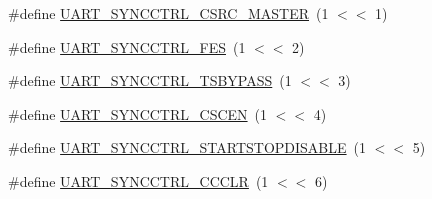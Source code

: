 \begin{DoxyCompactItemize}
\#define \hyperlink{group__UART__17XX__40XX_ga4776a7aa288f3c34e56db78cfb7032eb}{U\-A\-R\-T\-\_\-\-S\-Y\-N\-C\-C\-T\-R\-L\-\_\-\-C\-S\-R\-C\-\_\-\-M\-A\-S\-T\-E\-R}~(1 $<$$<$ 1)
\item 
\#define \hyperlink{group__UART__17XX__40XX_ga5263f24b5804673c99e8c6f09c95aed4}{U\-A\-R\-T\-\_\-\-S\-Y\-N\-C\-C\-T\-R\-L\-\_\-\-F\-E\-S}~(1 $<$$<$ 2)
\item 
\#define \hyperlink{group__UART__17XX__40XX_gaea12c85ea0d6a9fa91242904c707a285}{U\-A\-R\-T\-\_\-\-S\-Y\-N\-C\-C\-T\-R\-L\-\_\-\-T\-S\-B\-Y\-P\-A\-S\-S}~(1 $<$$<$ 3)
\item 
\#define \hyperlink{group__UART__17XX__40XX_ga17ff94fa4369905ab4a5f3bf28f44ced}{U\-A\-R\-T\-\_\-\-S\-Y\-N\-C\-C\-T\-R\-L\-\_\-\-C\-S\-C\-E\-N}~(1 $<$$<$ 4)
\item 
\#define \hyperlink{group__UART__17XX__40XX_ga5ebb09ebb7c6794ae8b2d1cd2c5fb193}{U\-A\-R\-T\-\_\-\-S\-Y\-N\-C\-C\-T\-R\-L\-\_\-\-S\-T\-A\-R\-T\-S\-T\-O\-P\-D\-I\-S\-A\-B\-L\-E}~(1 $<$$<$ 5)
\item 
\#define \hyperlink{group__UART__17XX__40XX_gaedc6fb3d7ba9d561d91f3fdcddcaccce}{U\-A\-R\-T\-\_\-\-S\-Y\-N\-C\-C\-T\-R\-L\-\_\-\-C\-C\-C\-L\-R}~(1 $<$$<$ 6)
\end{DoxyCompactItemize}
